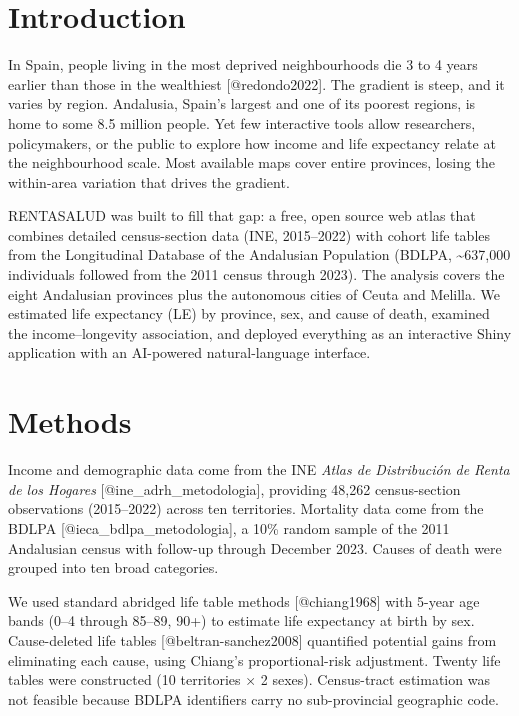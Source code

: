 \documentclass[
  11pt,
  a4paper,
]{article}
\begin{document}
\section{Introduction}\label{introduction}

In Spain, people living in the most deprived neighbourhoods die 3 to 4
years earlier than those in the wealthiest {[}@redondo2022{]}. The
gradient is steep, and it varies by region. Andalusia, Spain's largest
and one of its poorest regions, is home to some 8.5 million people. Yet
few interactive tools allow researchers, policymakers, or the public to
explore how income and life expectancy relate at the neighbourhood
scale. Most available maps cover entire provinces, losing the
within-area variation that drives the gradient.

RENTASALUD was built to fill that gap: a free, open source web atlas
that combines detailed census-section data (INE, 2015--2022) with cohort
life tables from the Longitudinal Database of the Andalusian Population
(BDLPA, \textasciitilde637,000 individuals followed from the 2011 census
through 2023). The analysis covers the eight Andalusian provinces plus
the autonomous cities of Ceuta and Melilla. We estimated life expectancy
(LE) by province, sex, and cause of death, examined the
income--longevity association, and deployed everything as an interactive
Shiny application with an AI-powered natural-language interface.

\section{Methods}\label{methods}

Income and demographic data come from the INE \emph{Atlas de
Distribución de Renta de los Hogares} {[}@ine\_adrh\_metodologia{]},
providing 48,262 census-section observations (2015--2022) across ten
territories. Mortality data come from the BDLPA
{[}@ieca\_bdlpa\_metodologia{]}, a 10\% random sample of the 2011
Andalusian census with follow-up through December 2023. Causes of death
were grouped into ten broad categories.

We used standard abridged life table methods {[}@chiang1968{]} with
5-year age bands (0--4 through 85--89, 90+) to estimate life expectancy
at birth by sex. Cause-deleted life tables {[}@beltran-sanchez2008{]}
quantified potential gains from eliminating each cause, using Chiang's
proportional-risk adjustment. Twenty life tables were constructed (10
territories × 2 sexes). Census-tract estimation was not feasible because
BDLPA identifiers carry no sub-provincial geographic code.
\end{document}
